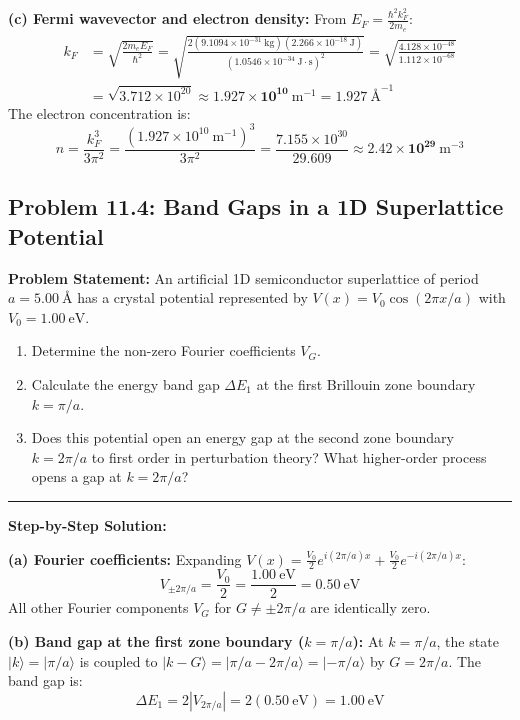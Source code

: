 \documentclass[11pt,a4paper]{article}
\begin{document}
\textbf{(c) Fermi wavevector and electron density:}
From $E_F = \frac{\hbar^2 k_F^2}{2m_e}$:
\begin{align*}
k_F &= \sqrt{\frac{2m_e E_F}{\hbar^2}} = \sqrt{\frac{2(9.1094 \times 10^{-31}\ \mathrm{kg})(2.266 \times 10^{-18}\ \mathrm{J})}{(1.0546 \times 10^{-34}\ \mathrm{J\cdot s})^2}} = \sqrt{\frac{4.128 \times 10^{-48}}{1.112 \times 10^{-68}}} \\
&= \sqrt{3.712 \times 10^{20}} \approx \mathbf{1.927 \times 10^{10}\ \mathrm{m^{-1}}} = 1.927\ \text{\AA}^{-1}
\end{align*}
The electron concentration is:
\[
n = \frac{k_F^3}{3\pi^2} = \frac{(1.927 \times 10^{10}\ \mathrm{m^{-1}})^3}{3\pi^2} = \frac{7.155 \times 10^{30}}{29.609} \approx \mathbf{2.42 \times 10^{29}\ \mathrm{m^{-3}}}
\]

\vspace{0.4cm}

\subsection{Problem 11.4: Band Gaps in a 1D Superlattice Potential}
\textbf{Problem Statement:}
An artificial 1D semiconductor superlattice of period $a = 5.00\ \text{\AA}$ has a crystal potential represented by $V(x) = V_0 \cos(2\pi x/a)$ with $V_0 = 1.00\ \mathrm{eV}$.
\begin{enumerate}[label=(\alph*)]
    \item Determine the non-zero Fourier coefficients $V_G$.
    \item Calculate the energy band gap $\Delta E_1$ at the first Brillouin zone boundary $k = \pi/a$.
    \item Does this potential open an energy gap at the second zone boundary $k = 2\pi/a$ to first order in perturbation theory? What higher-order process opens a gap at $k = 2\pi/a$?
\end{enumerate}

\vspace{0.2cm}\hrule\vspace{0.2cm}
\textbf{Step-by-Step Solution:}

\textbf{(a) Fourier coefficients:}
Expanding $V(x) = \frac{V_0}{2}e^{i(2\pi/a)x} + \frac{V_0}{2}e^{-i(2\pi/a)x}$:
\[
V_{\pm 2\pi/a} = \frac{V_0}{2} = \frac{1.00\ \mathrm{eV}}{2} = \mathbf{0.50\ \mathrm{eV}}
\]
All other Fourier components $V_G$ for $G \neq \pm 2\pi/a$ are identically zero.

\textbf{(b) Band gap at the first zone boundary ($k = \pi/a$):}
At $k = \pi/a$, the state $|k\rangle = |\pi/a\rangle$ is coupled to $|k-G\rangle = |\pi/a - 2\pi/a\rangle = |-\pi/a\rangle$ by $G = 2\pi/a$.
The band gap is:
\[
\Delta E_1 = 2|V_{2\pi/a}| = 2(0.50\ \mathrm{eV}) = \mathbf{1.00\ \mathrm{eV}}
\]
\end{document}
